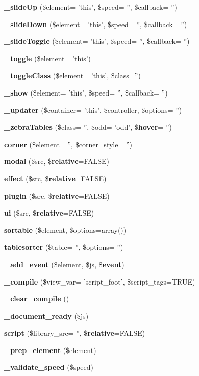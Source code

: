 \begin{DoxyCompactItemize}
{\bf \-\_\-slide\-Up} (\$element= 'this', \$speed= '', \$callback= '')
\item 
{\bf \-\_\-slide\-Down} (\$element= 'this', \$speed= '', \$callback= '')
\item 
{\bf \-\_\-slide\-Toggle} (\$element= 'this', \$speed= '', \$callback= '')
\item 
{\bf \-\_\-toggle} (\$element= 'this')
\item 
{\bf \-\_\-toggle\-Class} (\$element= 'this', \$class='')
\item 
{\bf \-\_\-show} (\$element= 'this', \$speed= '', \$callback= '')
\item 
{\bf \-\_\-updater} (\$container= 'this', \$controller, \$options= '')
\item 
{\bf \-\_\-zebra\-Tables} (\$class= '', \$odd= 'odd', \${\bf hover}= '')
\item 
{\bf corner} (\$element= '', \$corner\-\_\-style= '')
\item 
{\bf modal} (\$src, \${\bf relative}=F\-A\-L\-S\-E)
\item 
{\bf effect} (\$src, \${\bf relative}=F\-A\-L\-S\-E)
\item 
{\bf plugin} (\$src, \${\bf relative}=F\-A\-L\-S\-E)
\item 
{\bf ui} (\$src, \${\bf relative}=F\-A\-L\-S\-E)
\item 
{\bf sortable} (\$element, \$options=array())
\item 
{\bf tablesorter} (\$table= '', \$options= '')
\item 
{\bf \-\_\-add\-\_\-event} (\$element, \$js, \${\bf event})
\item 
{\bf \-\_\-compile} (\$view\-\_\-var= 'script\-\_\-foot', \$script\-\_\-tags=T\-R\-U\-E)
\item 
{\bf \-\_\-clear\-\_\-compile} ()
\item 
{\bf \-\_\-document\-\_\-ready} (\$js)
\item 
{\bf script} (\$library\-\_\-src= '', \${\bf relative}=F\-A\-L\-S\-E)
\item 
{\bf \-\_\-prep\-\_\-element} (\$element)
\item 
{\bf \-\_\-validate\-\_\-speed} (\$speed)
\end{DoxyCompactItemize}

